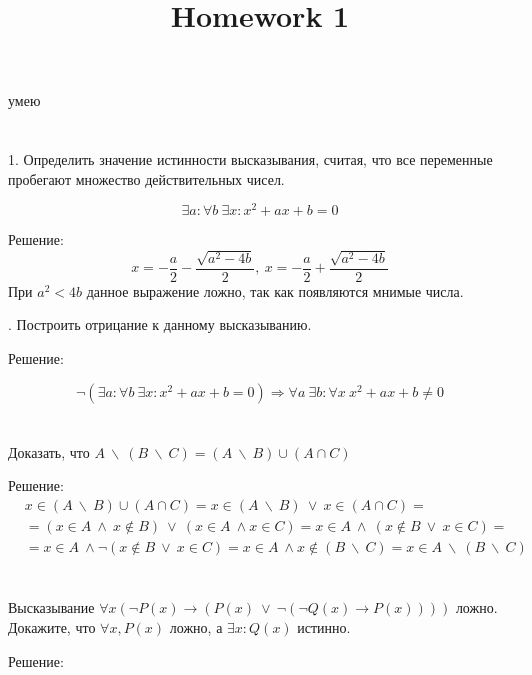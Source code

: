 \documentclass[a4paper, fontsize=12pt]{article} %
\title{Homework 1}
\date{}
\begin{document}
    \maketitle

    \section{}

    умею

    \section{\normalsize \normalfont }

    1. Определить значение истинности высказывания, считая, что все переменные
    пробегают множество действительных чисел.

    $$\exists a : \forall b \  \exists x : x^2 + ax + b = 0$$ \smallskip

    Решение:
    $$x = - \frac{a}{2} - \frac{\sqrt{a^{2} - 4 b}}{2}, \  x = - \frac{a}{2} + \frac{\sqrt{a^{2} - 4 b}}{2}$$\smallskip
    При $a^2 < 4b$ данное выражение ложно, так как появляются мнимые числа.

    \smallskip
    . Построить отрицание к данному высказыванию. \bigskip

    Решение:

    $$\lnot (\exists a : \forall b \  \exists x : x^2 + ax + b = 0) \Longrightarrow \forall
    a \ \exists b : \forall x \ x^2 + ax + b \neq 0$$

    
    \section{}
    Доказать, что $A \  \backslash \  (B \ \backslash \  C) = (A \ \backslash \ B) \cup (A \cap C)$

    Решение:
    \begin{align*}
        &x \in (A \ \backslash \ B) \cup (A \cap C) = x \in (A \ \backslash \ B) \ \vee \ x \in (A \cap C) =\\
        &=(x \in A \ \wedge \ x \notin B) \ \vee \ (x \in A \ \wedge x \in C) = x \in A \  \wedge \ (x \notin 
        B \ \vee \ x \in C) =\\
        &= x \in A \ \wedge \lnot  (x \notin B \ \vee \ x \in C) = x \in A \ \wedge x \notin (B \ \backslash \ C) =
        x \in A \ \backslash \ (B \ \backslash \ C)
    \end{align*}

    \section{}
    Высказывание $\forall x(\lnot P(x) \rightarrow (P(x) \ \vee \ \lnot(\lnot Q(x) \rightarrow P(x))))$ ложно. Докажите, что 
    $\forall x, P(x)$ ложно, а $\exists x : Q(x)$ истинно.

    Решение:
    
    

    
\end{document}
